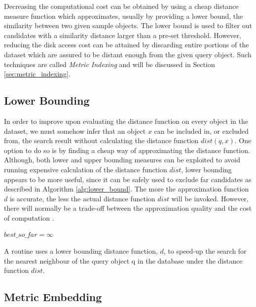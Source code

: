 \iftoggle{edit-mode}{\hspace{0pt}\marginpar{Solution directions}}{}
Decreasing the computational cost can be obtained by using a cheap distance measure function which approximates, usually by providing a lower bound, the similarity between two given sample objects. 
The lower bound is used to filter out candidates with a similarity distance larger than a pre-set threshold. 
However, reducing the disk access cost can be attained by discarding entire portions of the dataset which are assured to be distant enough from the given query object. 
Such techniques are called \emph{Metric Indexing} and will be discussed in Section \ref{sec:metric_indexing}.


\subsection{Lower Bounding}
\label{subsec:lower_bounding}
\iftoggle{edit-mode}{\hspace{0pt}\marginpar{Distance function approximation}}{}
In order to improve upon evaluating the distance function on every object in the dataset, we must somehow infer that an object $x$ can be included in, or excluded from, the search result without calculating the distance function $dist(q, x)$. One option to do so is by finding a cheap way of approximating the distance function. 
Although, both lower and upper bounding measures can be exploited to avoid running expensive calculation of the distance function $dist$, lower bounding appears to be more useful, since it can be safely used to exclude far candidates as described in Algorithm \ref{alg:lower_bound}. 
The more the approximation function $d$ is accurate, the less the actual distance function $dist$ will be invoked. However, there will normally be a trade-off between the approximation quality and the cost of computation \cite{hetland2009basic, keogh2005exact}.

\begin{algorithm}
$best\_so\_far = \infty$\;
\caption{A routine uses a lower bounding distance function, $d$, to speed-up the search for the nearest neighbour of the query object q in the database under the distance function $dist$.}
\label{alg:lower_bound}
\end{algorithm}

\subsection{Metric Embedding}
\label{subsec:metric_embedding}

